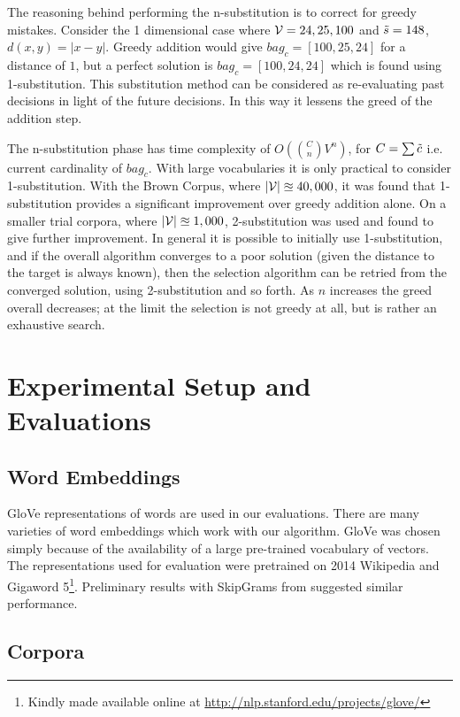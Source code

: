 \documentclass{book}
\begin{document}
The reasoning behind performing the n-substitution is to correct for greedy mistakes. Consider the 1 dimensional case where $\mathcal{V}={24,25,100}$ and $\tilde{s}=148$, $d(x,y)=\left|x-y\right|$. Greedy addition would give  $bag_c=[100,25,24]$ for a distance of $1$, but a perfect solution  is $bag_c=[100,24,24]$ which is found using 1-substitution. This substitution method can be considered as re-evaluating past decisions in light of the future decisions. In this way it lessens the greed of the addition step. 

The n-substitution phase has time complexity of $O(\binom{C}{n}V^n)$, for $C=\sum \tilde{c}$ i.e. current cardinality of $bag_c$. With large vocabularies it is only practical to consider 1-substitution. With the Brown Corpus, where $|\mathcal{V}|\approxeq 40,000$, it was found that 1-substitution provides a significant improvement over greedy addition alone. On a smaller trial corpora, where $|\mathcal{V}|\approxeq 1,000$, 2-substitution was used and found to give further improvement. In general it is possible to initially use 1-substitution, and if the overall algorithm converges to a poor solution (given the distance to the target is always known), then the selection algorithm can be retried from the converged solution, using 2-substitution and so forth. As $n$ increases the greed overall decreases; at the limit the selection is not greedy at all, but is rather an exhaustive search.


\section{Experimental Setup and Evaluations} \label{evalsettings}


\subsection{Word Embeddings}
GloVe representations of words \parencite{pennington2014glove} are used in our evaluations. There are many varieties of word embeddings which work with our algorithm. GloVe was chosen simply because of the availability of a large pre-trained vocabulary of vectors. The representations used for evaluation were pretrained on 2014 Wikipedia and Gigaword 5\footnote{Kindly made available online at \url{http://nlp.stanford.edu/projects/glove/}}. Preliminary results with SkipGrams from \textcite{mikolov2013efficient} suggested similar performance.

\subsection{Corpora}
\end{document}

